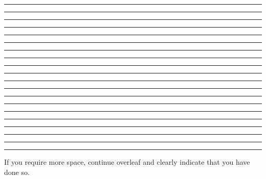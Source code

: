 \documentclass[a4paper,10pt]{article}
\begin{document}
\begin{enumerate}
\vspace{7mm}\hrule\vspace{7mm}\hrule\vspace{7mm}\hrule\vspace{7mm}\hrule
\vspace{7mm}\hrule\vspace{7mm}\hrule\vspace{7mm}\hrule\vspace{7mm}\hrule
\vspace{7mm}\hrule\vspace{7mm}\hrule\vspace{7mm}\hrule\vspace{7mm}\hrule
\vspace{7mm}\hrule\vspace{7mm}\hrule\vspace{7mm}\hrule\vspace{7mm}\hrule
\vspace{7mm}\hrule\vspace{7mm}\hrule\vspace{7mm}\hrule\vspace{7mm}\hrule
\vspace{3mm}

If you require more space, continue overleaf and clearly indicate that you have done
so.

\end{enumerate}
\end{document}
